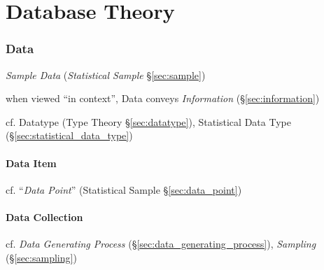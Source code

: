 \part{Database Theory}\label{part:database_theory}

\section{Data}\label{sec:data}

\emph{Sample Data} (\emph{Statistical Sample} \S\ref{sec:sample})

when viewed ``in context'', Data conveys \emph{Information}
(\S\ref{sec:information})

\fist cf. Datatype (Type Theory \S\ref{sec:datatype}), Statistical Data Type
(\S\ref{sec:statistical_data_type})



\subsection{Data Item}\label{sec:data_item}

cf. ``\emph{Data Point}'' (Statistical Sample \S\ref{sec:data_point})



\subsection{Data Collection}\label{sec:data_collection}

cf. \emph{Data Generating Process} (\S\ref{sec:data_generating_process}),
\emph{Sampling} (\S\ref{sec:sampling})



